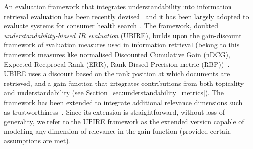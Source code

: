 
An evaluation framework that integrates understandability into information retrieval evaluation has been recently devised~\cite{zuccon14,zuccon16} and it has been largely adopted to evaluate systems for consumer health search~\cite{clefIR15,clefIR16,clefIR17}. The framework, doubted \textit{understandability-biased IR evaluation} (UBIRE), builds upon the gain-discount framework of evaluation measures used in information retrieval (belong to this framework measures like normalised Discounted Cumulative Gain (nDCG), Expected Reciprocal Rank (ERR), Rank Biased Precision metric (RBP))~\cite{carterette11}. UBIRE uses a discount based on the rank position at which documents are retrieved, and a gain function that integrates contributions from both topicality and understandability (see Section~\ref{sec:understandability_metrics}). The framework has been extended to integrate additional relevance dimensions such as trustworthiness~\cite{clefIR17}. Since its extension is straightforward, without loss of generality, we refer to the UBIRE framework as the extended version capable of modelling any dimension of relevance in the gain function (provided certain assumptions are met).

